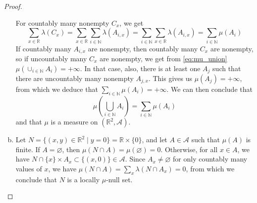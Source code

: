 \documentclass[11pt,a4paper,twoside]{article}
\theoremstyle{definition}
\begin{document}
\begin{proof}
\begin{enumerate}[(a)]
    For countably many nonempty $C_x$, we get
    \begin{equation*}
      \sum_{x \in \mathbb{R}} \lambda ( C_x ) =
      \sum_{x \in \mathbb{R}} \sum_{i \in \mathbb{N}} \lambda ( A_{i, x} ) = \sum_{i \in \mathbb{N}} \sum_{x \in \mathbb{R}} \lambda ( A_{i, x} )
      = \sum_{i \in \mathbb{N}} \mu \left( A_i \right)
    \end{equation*}
    If countably many $A_{i, x}$ are nonempty, then countably many $C_x$ are nonempty, so if uncountably many $C_x$ are nonempty,
    we get from \eqref{eq:mu_union} $\mu ( \cup_{i \in \mathbb{N}} A_i ) = +\infty$. In that case, also, there is at least one $A_j$ such that
    there are uncountably many nonempty $A_{j, x}$. This gives us $\mu ( A_j ) = +\infty$, from which we deduce that $\sum_{i \in \mathbb{N}} \mu (A_i) = +\infty$.
    We can then conclude that
    \begin{equation*}
      \mu \left( \bigcup_{i \in \mathbb{N}} A_i \right) = \sum_{i \in \mathbb{N}} \mu ( A_i )
    \end{equation*}
    and that $\mu$ is a measure on $( \mathbb{R}^2, \mathscr{A} )$.

  \item Let $N = \{ (x, y) \in \mathbb{R}^2 \mid y = 0 \} = \mathbb{R} \times \{ 0 \}$, and let $A \in \mathscr{A}$ such that $\mu ( A )$ is finite.
    If $A = \varnothing$, then $\mu ( N \cap A ) = \mu ( \varnothing ) = 0$.
    Otherwise, for all $x \in A$, we have $N \cap \{ x \} \times A_x \subset \{ (x, 0) \} \in \mathscr{A}$.
    Since $A_x \neq \varnothing$ for only countably many values of $x$, we have $\mu ( N \cap A ) = \sum_x \lambda ( N \cap A_x ) = 0$,
    from which we conclude that $N$ is a locally $\mu$-null set.

  \end{enumerate}

\end{proof}
\end{document}
